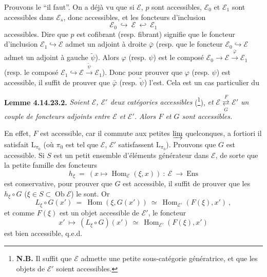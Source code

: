 \documentclass[11pt]{article}
\newcommand{\printedpage}[1]{\marginpar{\footnotesize p.~#1}}
\newcommand{\msp}[1]{\marginpar{\footnotesize [#1]}}
\newcommand{\Ob}{\operatorname{Ob}}
\newcommand{\Hom}{\operatorname{Hom}}
\newcommand{\Ens}{\mathrm{Ens}}
\begin{document}
\msp{page 411}

Prouvons le “il faut”. On a déjà vu que si $\mathcal{E}$, $p$ sont accessibles, $\mathcal{E}_0$ et $\mathcal{E}_1$ sont accessibles dans $\mathcal{E}_s$, donc accessibles, et les foncteurs d'inclusion %
\[
\mathcal{E}_0\ \hookrightarrow\ \mathcal{E}\ \hookleftarrow\ \mathcal{E}_1
\]
accessibles. Dire que $p$ est cofibrant (resp. fibrant) signifie que le foncteur d'inclusion $\mathcal{E}_1\hookrightarrow\mathcal{E}$ admet un adjoint à droite $\bar{\varphi}$ (resp. que le foncteur $\mathcal{E}_0\hookrightarrow\mathcal{E}$ admet un adjoint à gauche $\tilde{\psi}$). Alors $\varphi$ (resp. $\psi$) est le composé $\mathcal{E}_0\longrightarrow\mathcal{E}\xrightarrow{\;\bar{\varphi}\;}\mathcal{E}_1$ (resp. le composé $\mathcal{E}_1\hookrightarrow\mathcal{E}\xrightarrow{\;\tilde{\psi}\;}\mathcal{E}_1$). Donc pour prouver que $\varphi$ (resp. $\psi$) est accessible, il suffit de prouver que $\bar{\varphi}$ (resp. $\tilde{\psi}$) l'est. Cela est un cas particulier du %

\textbf{Lemme 4.14.23.2.} \textit{Soient $\mathcal{E}$, $\mathcal{E}'$ deux catégories accessibles} (\footnote[172]{\textbf{N.B.} Il suffit que $\mathcal{E}$ admette une petite sous-catégorie génératrice, et que les objets de $\mathcal{E}'$ soient accessibles.}), \textit{et $\mathcal{E}\underset{G}{\overset{F}{\rightleftarrows}}\mathcal{E}'$ un couple de foncteurs adjoints entre $\mathcal{E}$ et $\mathcal{E}'$. Alors $F$ et $G$ sont accessibles.}

\msp{page 412}

En effet, $F$ est accessible, car il commute aux petites $\varinjlim$ quelconques, a fortiori il satisfait $\mathrm{L}_{\pi_0}$ (où $\pi_0$ est tel que $\mathcal{E}$, $\mathcal{E}'$ satisfassent $\mathrm{L}_{\pi_0}$). Prouvons que $G$ est accessible. Si $S$ est un
\printedpage{156}
petit ensemble d'éléments générateur dans $\mathcal{E}$, de sorte que la petite famille des foncteurs
\[
h_\xi\ =\ (x\longmapsto\Hom_{\mathcal{E}}(\xi,x))\ :\ \mathcal{E}\ \longrightarrow\ \Ens
\]
est conservative, pour prouver que $G$ est accessible, il suffit de prouver que les $h_\xi\circ G$ ($\xi\in S\subset\Ob\mathcal{E}$) le sont. Or
\[
L_\xi\circ G(x')\ =\ \Hom(\xi,G(x'))\ \simeq\ \Hom_{\mathcal{E}'}(F(\xi),x')\ , %
\]
et comme $F(\xi)$ est un objet accessible de $\mathcal{E}'$, le foncteur
\[
x'\ \longmapsto\ (L_\xi\circ G)(x')\ \simeq\ \Hom_{\mathcal{E}'}(F(\xi),x') %
\]
est bien accessible, q.e.d.
\end{document}

